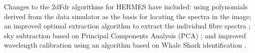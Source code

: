 Changes to the 2dFdr algorithms for HERMES have included: using polynomials derived from the data simulator as the basis for locating the spectra in the image; an improved optimal extraction algorithm to extract the individual fibre spectra \citep{OptExt_2010}; sky subtraction based on Principal Components Analysis (PCA) \citep{PCA_2010}; and improved wavelength calibration using an algorithm based on Whale Shark identification \citep{Sharks_2005}.



